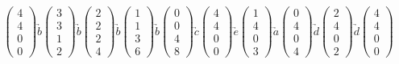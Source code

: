\[
\begin{pmatrix}
4\\4\\0\\0
\end{pmatrix}
\underrightarrow{b}
\begin{pmatrix}
3\\3\\1\\2
\end{pmatrix}
\underrightarrow{b}
\begin{pmatrix}
2\\2\\2\\4
\end{pmatrix}
\underrightarrow{b}
\begin{pmatrix}
1\\1\\3\\6
\end{pmatrix}
\underrightarrow{b}
\begin{pmatrix}
0\\0\\4\\8
\end{pmatrix}
\underrightarrow{c}
\begin{pmatrix}
4\\4\\0\\0
\end{pmatrix}
\underrightarrow{e}
\begin{pmatrix}
1\\4\\0\\3
\end{pmatrix}
\underrightarrow{a}
\begin{pmatrix}
0\\4\\0\\4
\end{pmatrix}
\underrightarrow{d}
\begin{pmatrix}
2\\4\\0\\2
\end{pmatrix}
\underrightarrow{d}
\begin{pmatrix}
4\\4\\0\\0
\end{pmatrix}
\]